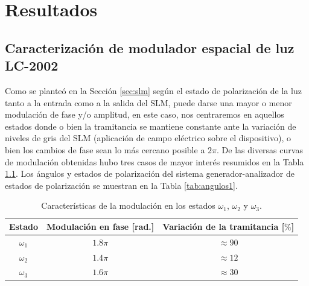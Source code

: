 \chapter{Resultados}
\label{cap:resultados}


%
%

\section{Caracterización de modulador espacial de luz LC-2002}
\label{sec:carac_slm}

Como se planteó en la Sección \ref{sec:slm} según el estado de polarización de la luz tanto a la entrada como a la salida del SLM, puede darse una mayor o menor modulación de fase y/o amplitud, en este caso, nos centraremos en aquellos estados donde o bien la tramitancia se mantiene constante ante la variación de niveles de gris del SLM (aplicación de campo eléctrico sobre el dispositivo), o bien los cambios de fase sean lo más cercano posible a $2\pi$. De las diversas curvas de modulación obtenidas hubo tres casos de mayor interés resumidos en la Tabla \ref{tab:mods}. Los ángulos y estados de polarización del sistema generador-analizador de estados de polarización se muestran en la Tabla \ref{tab:angulos1}.\\

\begin{table}[!ht]
\centering
\begin{tabular}{|c|c|c|}
\hline 
\rule[-1ex]{0pt}{2.5ex} Estado & Modulación en fase [rad.] & Variación de la tramitancia [$\%$]\\ 
\hline 
\rule[-1ex]{0pt}{2.5ex} $\omega_1$ & $1.8\pi$ & $\approx 90$ \\ 
\hline 
\rule[-1ex]{0pt}{2.5ex} $\omega_2$ & $1.4\pi$ & $\approx 12$ \\ 
\hline 
\rule[-1ex]{0pt}{2.5ex} $\omega_3$ & $1.6\pi$ & $\approx 30$ \\ 
\hline 
\end{tabular} 
\caption{Características de la modulación en los estados $\omega_1$, $\omega_2$ y $\omega_3$.}
\label{tab:mods}
\end{table}




